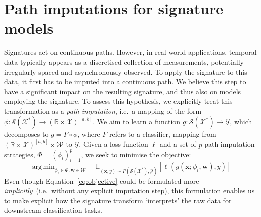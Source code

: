 \documentclass{article}
\DeclareMathOperator*{\argmin}{arg\,min}
\newcommand{\reals}{\mathbb{R}}
\newcommand{\dataspace}{\mathcal{X}}
\newcommand{\lspace}{\mathcal{Y}}
\newcommand{\seriesspace}{\mathcal{S}}
\begin{document}
\section{Path imputations for signature models}

Signatures act on continuous paths. However, in real-world
applications, temporal data typically appears as a discretised
collection of measurements, potentially irregularly-spaced and
asynchronously observed. To apply the signature to this data,
it first has to be imputed into a continuous path.
%
We believe this step to have a significant impact on the
resulting signature, and thus also on models employing the signature.
To assess this hypothesis, we explicitly treat this transformation
as a \emph{path imputation}, i.e.\ a mapping of the form $ \phi \colon \seriesspace(\dataspace^*) \to (\reals \times \dataspace)^{[a, b]}.$
%
We aim to learn a function $ g \colon \seriesspace(\dataspace^*) \to
\lspace$, which decomposes to $g = F \circ \phi$, where $F$ refers to
a classifier, mapping from $(\reals \times \dataspace)^{[a, b]} \times \mathcal{W} $ to
$\lspace$. Given a loss function $\ell$ and a set of $p$ path
imputation strategies, ${\Phi} =(\phi_i)_{i=1}^p$, we seek to minimise the
objective:
%
\begin{equation}
    \argmin_{\phi_i \in \Phi, \mathbf{w} \in \mathcal{W}} \quad \mathbb{E}_{(\mathbf{x},y) \sim P(\seriesspace(\dataspace^*),\lspace) } \left[ \ell( g(\mathbf{x}; \phi_i, \mathbf{w}), y) \right]
    \label{eq:objective}
\end{equation} 
%
Even though Equation~\eqref{eq:objective} could be formulated more
\emph{implicitly}~(i.e.\ without any explicit imputation step),
this formulation enables us to make explicit how the signature transform
`interprets' the raw data for downstream classification tasks. 
\end{document}
